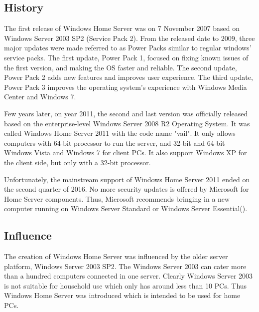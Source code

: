 \documentclass[a4paper, 12pt]{article}
\begin{document}
\subsection{History}

The first release of Windows Home Server was on 7 November 2007 based on Windows Server 2003 SP2 (Service Pack 2). From the released date to 2009, three major updates were made referred to as Power Packs similar to regular windows’ service packs. The first update, Power Pack 1, focused on fixing known issues of the first version, and making the OS faster and reliable. The second update, Power Pack 2 adds new features and improves user experience. The third update, Power Pack 3 improves the operating system's experience with Windows Media Center and Windows 7\parencite{microsoft2009Dec}.

Few years later, on year 2011, the second and last version was officially released based on the enterprise-level Windows Server 2008 R2 Operating System. It was called Windows Home Server 2011 with the code name "vail". It only allows computers with 64-bit processor to run the server, and 32-bit and 64-bit Windows Vista and Windows 7 for client PCs. It also support Windows XP for the client side, but only with a 32-bit processor\parencite{informit2011Apr}. 

Unfortunately, the mainstream support of Windows Home Server 2011 ended on the second quarter of 2016. No more security updates is offered by Microsoft for Home Server components. Thus, Microsoft recommends bringing in a new computer running on Windows Server Standard or Windows Server Essential(\cite{pivovarova219end}). 

\subsection{Influence}
The creation of Windows Home Server was influenced by the older server platform, Windows Server 2003 SP2. The Windows Server 2003 can cater more than a hundred computers connected in one server. Clearly Windows Server 2003 is not suitable for household use which only has around less than 10 PCs. Thus Windows Home Server was introduced which is intended to be used for home PCs. 

\end{document}
